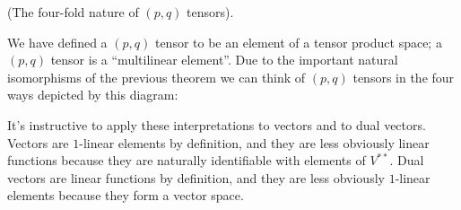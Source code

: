 \begin{remark}
    (The four-fold nature of $(p, q)$ tensors).
    
    We have defined a $(p, q)$ tensor to be an element of a tensor product space; a $(p, q)$ tensor is a ``multilinear element''. Due to the important natural isomorphisms of the previous theorem we can think of $(p, q)$ tensors in the four ways depicted by this diagram:
    
    \begin{center}
    \end{center}
    
    It's instructive to apply these interpretations to vectors and to dual vectors. Vectors are $1$-linear elements by definition, and they are less obviously linear functions because they are naturally identifiable with elements of $V^{**}$. Dual vectors are linear functions by definition, and they are less obviously $1$-linear elements because they form a vector space.
\end{remark}

